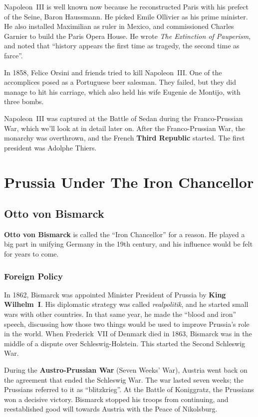 Napoleon~III is well known now because he reconstructed Paris with his prefect of the Seine, Baron Haussmann.
He picked Emile Ollivier as his prime minister.
He also installed Maximilian as ruler in Mexico, and commissioned Charles Garnier to build the Paris Opera House.
He wrote \textit{The Extinction of Pauperism},
and noted that ``history appears the first time as tragedy, the second time as farce''.

In 1858, Felice Orsini and friends tried to kill Napoleon~III\@.
One of the accomplices posed as a Portuguese beer salesman.
They failed, but they did manage to hit his carriage, which also held his wife Eugenie de Montijo, with three bombs.

Napoleon~III was captured at the Battle of Sedan during the Franco-Prussian War,
which we'll look at in detail later on.
After the Franco-Prussian War, the monarchy was overthrown, and the French \textbf{Third Republic} started.
The first president was Adolphe Thiers.

\section{Prussia Under The Iron Chancellor}

\subsection*{Otto von Bismarck}

\textbf{Otto von Bismarck} is called the ``Iron Chancellor'' for a reason.
He played a big part in unifying Germany in the 19th century, and his influence would be felt for years to come.

\subsubsection*{Foreign Policy}

In 1862, Bismarck was appointed Minister President of Prussia by \textbf{King Wilhelm~I}.
His diplomatic strategy was called \textit{realpolitik}, and he started small wars with other countries.
In that same year, he made the ``blood and iron'' speech,
discussing how those two things would be used to improve Prussia's role in the world.
When Frederick~VII of Denmark died in 1863, Bismarck was in the middle of a dispute over Schleswig-Holstein.
This started the Second Schleswig War.

During the \textbf{Austro-Prussian War} (Seven Weeks' War), Austria went back on the agreement that ended the Schleswig War.
The war lasted seven weeks; the Prussians referred to it as ``blitzkrieg''.
At the Battle of Koniggratz, the Prussians won a decisive victory.
Bismarck stopped his troops from continuing, and reestablished good will towards Austria with the Peace of Nikolsburg.

